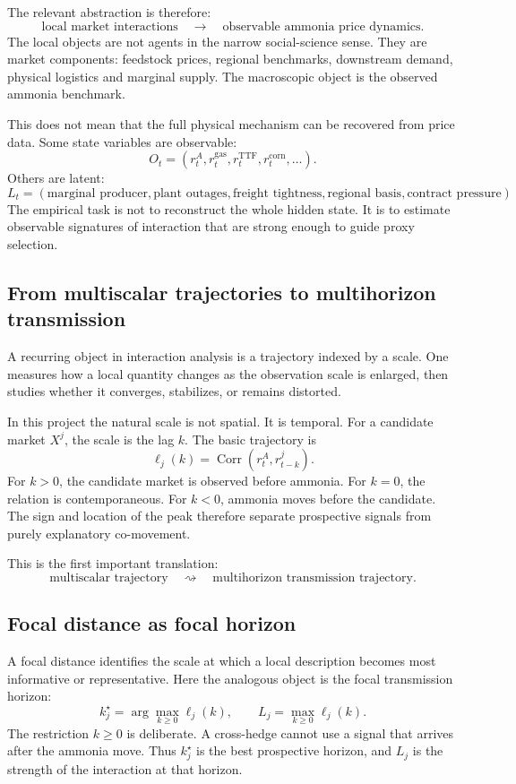 \documentclass[11pt]{article}
\newcommand{\Corr}{\operatorname{Corr}}
\newcommand{\1}{\mathbf 1}
\begin{document}
The relevant abstraction is therefore:
\[
\text{local market interactions}
\quad\longrightarrow\quad
\text{observable ammonia price dynamics}.
\]
The local objects are not agents in the narrow social-science sense. They are market components: feedstock prices, regional benchmarks, downstream demand, physical logistics and marginal supply. The macroscopic object is the observed ammonia benchmark.

This does not mean that the full physical mechanism can be recovered from price data. Some state variables are observable:
\[
O_t
=
\left(
r^A_t,
r^{\mathrm{gas}}_t,
r^{\mathrm{TTF}}_t,
r^{\mathrm{corn}}_t,
\ldots
\right).
\]
Others are latent:
\[
L_t
=
\left(
\text{marginal producer},
\text{plant outages},
\text{freight tightness},
\text{regional basis},
\text{contract pressure}
\right).
\]
The empirical task is not to reconstruct the whole hidden state. It is to estimate observable signatures of interaction that are strong enough to guide proxy selection.

\subsection{From multiscalar trajectories to multihorizon transmission}

A recurring object in interaction analysis is a trajectory indexed by a scale. One measures how a local quantity changes as the observation scale is enlarged, then studies whether it converges, stabilizes, or remains distorted.

In this project the natural scale is not spatial. It is temporal. For a candidate market \(X^j\), the scale is the lag \(k\). The basic trajectory is
\[
\ell_j(k)
=
\Corr\left(r^A_t,r^j_{t-k}\right).
\]
For \(k>0\), the candidate market is observed before ammonia. For \(k=0\), the relation is contemporaneous. For \(k<0\), ammonia moves before the candidate. The sign and location of the peak therefore separate prospective signals from purely explanatory co-movement.

This is the first important translation:
\[
\text{multiscalar trajectory}
\quad\rightsquigarrow\quad
\text{multihorizon transmission trajectory}.
\]

\subsection{Focal distance as focal horizon}

A focal distance identifies the scale at which a local description becomes most informative or representative. Here the analogous object is the focal transmission horizon:
\[
k_j^\star
=
\arg\max_{k\geq 0}\ell_j(k),
\qquad
L_j
=
\max_{k\geq 0}\ell_j(k).
\]
The restriction \(k\geq0\) is deliberate. A cross-hedge cannot use a signal that arrives after the ammonia move. Thus \(k_j^\star\) is the best prospective horizon, and \(L_j\) is the strength of the interaction at that horizon.
\end{document}
